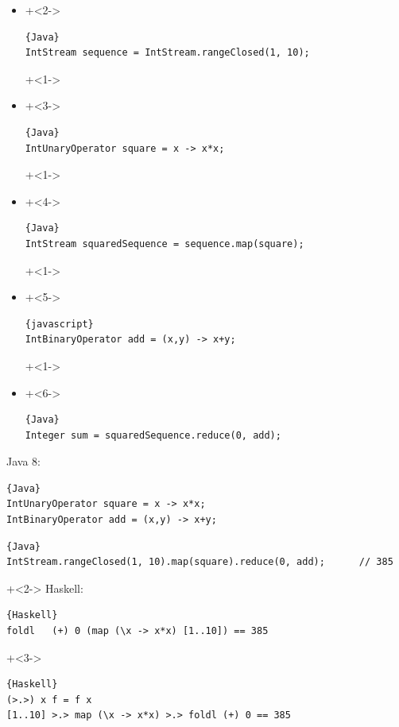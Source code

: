 \begin{frame}[fragile]{}
\begin{itemize}
\item {}
\onslide+<2->
\begin{lstlisting}{Java}
IntStream sequence = IntStream.rangeClosed(1, 10);
\end{lstlisting}
\onslide+<1->
\item {}
\onslide+<3->
\begin{lstlisting}{Java}
IntUnaryOperator square = x -> x*x;
\end{lstlisting}
\onslide+<1->
\item {}
\onslide+<4->
\begin{lstlisting}{Java}
IntStream squaredSequence = sequence.map(square);
\end{lstlisting}
\onslide+<1->
\item {}
\onslide+<5->
\begin{lstlisting}{javascript}
IntBinaryOperator add = (x,y) -> x+y;
\end{lstlisting}
\onslide+<1->
\item {}
\onslide+<6->
\begin{lstlisting}{Java}
Integer sum = squaredSequence.reduce(0, add);
\end{lstlisting}
\end{itemize}

\end{frame}

\begin{frame}[fragile]{}
Java 8:
\begin{lstlisting}{Java}
IntUnaryOperator square = x -> x*x;
IntBinaryOperator add = (x,y) -> x+y;
\end{lstlisting}

\begin{lstlisting}{Java}
IntStream.rangeClosed(1, 10).map(square).reduce(0, add);      // 385
\end{lstlisting}

\onslide+<2->
Haskell:
\begin{lstlisting}{Haskell}
foldl	(+) 0 (map (\x -> x*x) [1..10]) == 385
\end{lstlisting}
\onslide+<3->
\begin{lstlisting}{Haskell}
(>.>) x f = f x
[1..10] >.> map (\x -> x*x) >.> foldl (+) 0 == 385
\end{lstlisting}

\end{frame}

